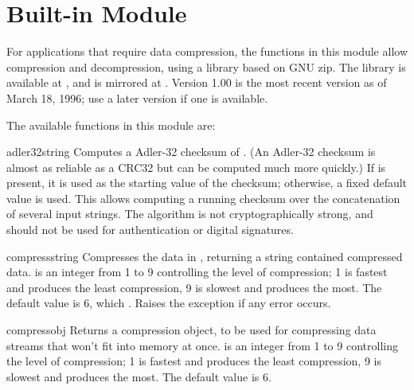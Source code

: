 %

\section{Built-in Module }

For applications that require data compression, the functions in this
module allow compression and decompression, using a library based on
GNU zip.  The library is available at
, 
and is mirrored at
.  Version
1.00 is the most recent version as of March 18, 1996; use a later
version if one is available.

The available functions in this module are:

\renewcommand{\indexsubitem}{(in module zlib)}
\begin{funcdesc}{adler32}{string}
   Computes a Adler-32 checksum of .  (An Adler-32
   checksum is almost as reliable as a CRC32 but can be computed much
   more quickly.)  If  is present, it is used as the
   starting value of the checksum; otherwise, a fixed default value is
   used.  This allows computing a running checksum over the
   concatenation of several input strings.  The algorithm is not
   cryptographically strong, and should not be used for
   authentication or digital signatures.
\end{funcdesc}

\begin{funcdesc}{compress}{string}
Compresses the data in , returning a string contained
compressed data.   is an integer from 1 to 9 controlling
the level of compression; 1 is fastest and produces the least
compression, 9 is slowest and produces the most.  The default value is
6, which .  Raises the  exception if any error occurs.
\end{funcdesc}

\begin{funcdesc}{compressobj}{}
Returns a compression object, to be used for compressing data streams
  that won't fit into memory at once.   is an integer from
  1 to 9 controlling the level of compression; 1 is fastest and
  produces the least compression, 9 is slowest and produces the most.
  The default value is 6.
\end{funcdesc}


